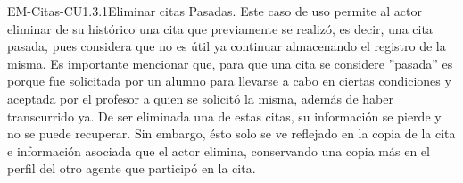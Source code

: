 \begin{UseCase}{EM-Citas-CU1.3.1}{Eliminar citas Pasadas.}
	{
	\noindent
	Este caso de uso permite al actor eliminar de su histórico una cita que previamente se realizó, es decir, una cita pasada, pues considera que no es útil ya continuar almacenando el registro de la misma. 
	\newline
	Es importante mencionar que, para que una cita se considere ''pasada'' es porque fue solicitada por un alumno para llevarse a cabo en ciertas condiciones y aceptada por el profesor a quien se solicitó la misma, además de haber transcurrido ya. De ser eliminada una de estas citas, su información se pierde y no se puede recuperar. Sin embargo, ésto solo se ve reflejado en la copia de la cita e información asociada que el actor elimina, conservando una copia más en el perfil del otro agente que participó en la cita.
	\newline
	}
\end{UseCase}

